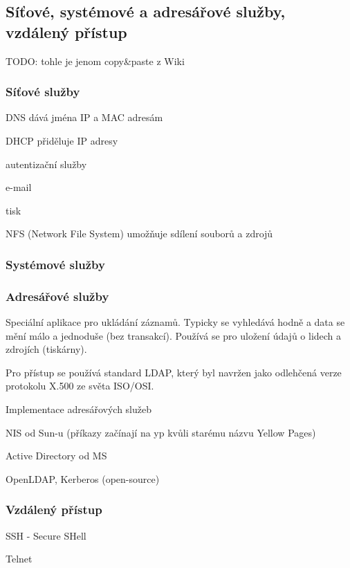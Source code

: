 \subsection{Síťové, systémové a adresářové služby, vzdálený přístup}

TODO: tohle je jenom copy\&paste z Wiki

\subsubsection*{Síťové služby}

\begin{pitemize}
    \item DNS dává jména IP a MAC adresám
    \item DHCP přiděluje IP adresy
    \item autentizační služby
    \item e-mail
    \item tisk
    \item NFS (Network File System) umožňuje sdílení souborů a zdrojů 
\end{pitemize}

\subsubsection*{Systémové služby}

\subsubsection*{Adresářové služby}
Speciální aplikace pro ukládání záznamů. Typicky se vyhledává hodně a data se
mění málo a jednoduše (bez transakcí). Používá se pro uložení údajů o lidech a
zdrojích (tiskárny).

Pro přístup se používá standard LDAP, který byl navržen jako odlehčená verze protokolu X.500 ze světa ISO/OSI.

\begin{obecne}{Implementace adresářových služeb}
  \begin{pitemize}
    \item NIS od Sun-u (příkazy začínají na yp kvůli starému názvu Yellow Pages)
    \item Active Directory od MS
    \item OpenLDAP, Kerberos (open-source) 
  \end{pitemize}
\end{obecne}

\subsubsection*{Vzdálený přístup}

\begin{pitemize}
    \item SSH - Secure SHell 
    \item Telnet
\end{pitemize}
